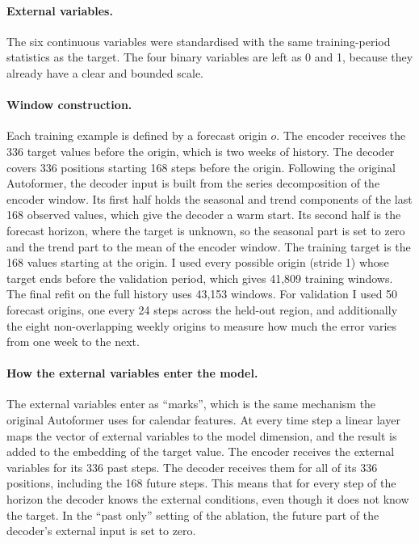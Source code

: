 \documentclass[a4, 12pt]{article}
\begin{document}
\paragraph{External variables.} The six continuous variables were standardised with the same training-period statistics as the target. The four binary variables are left as 0 and 1, because they already have a clear and bounded scale.

\paragraph{Window construction.} Each training example is defined by a forecast origin $o$. The encoder receives the 336 target values before the origin, which is two weeks of history. The decoder covers 336 positions starting 168 steps before the origin. Following the original Autoformer, the decoder input is built from the series decomposition of the encoder window. Its first half holds the seasonal and trend components of the last 168 observed values, which give the decoder a warm start. Its second half is the forecast horizon, where the target is unknown, so the seasonal part is set to zero and the trend part to the mean of the encoder window. The training target is the 168 values starting at the origin. I used every possible origin (stride 1) whose target ends before the validation period, which gives 41,809 training windows. The final refit on the full history uses 43,153 windows. For validation I used 50 forecast origins, one every 24 steps across the held-out region, and additionally the eight non-overlapping weekly origins to measure how much the error varies from one week to the next.

\paragraph{How the external variables enter the model.} The external variables enter as ``marks'', which is the same mechanism the original Autoformer uses for calendar features. At every time step a linear layer maps the vector of external variables to the model dimension, and the result is added to the embedding of the target value. The encoder receives the external variables for its 336 past steps. The decoder receives them for all of its 336 positions, including the 168 future steps. This means that for every step of the horizon the decoder knows the external conditions, even though it does not know the target. In the ``past only'' setting of the ablation, the future part of the decoder's external input is set to zero.
\end{document}
